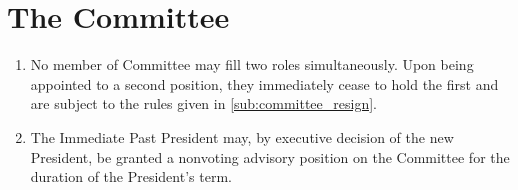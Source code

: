 \documentclass[a4paper]{article}
\newenvironment{enumsection}[1]{\section{#1} \begin{enumerate}[ref=\thesection.\theenumi]}{\end{enumerate}}
\begin{document}
\begin{enumsection}{The Committee}
\begin{enumerate}
\begin{enumerate}
        \end{enumerate}
        \item Remain vacant and be filled by election (as per \cref{sec:AGMs}) at the next General Meeting, which must be held within the next 2 weeks.
    \end{enumerate}
    \item No member of Committee may fill two roles simultaneously. Upon being appointed to a second position, they immediately cease to hold the first and are subject to the rules given in \cref{sub:committee_resign}.
    \item \label{sub:ipp_appointment} The Immediate Past President may, by executive decision of the new President, be granted a nonvoting advisory position on the Committee for the duration of the President's term.
\end{enumsection}
\end{document}
